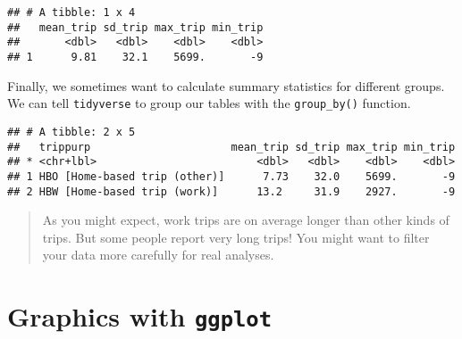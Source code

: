 \documentclass[]{book}
\newenvironment{Shaded}{\begin{snugshade}}{\end{snugshade}}
\newcommand{\DataTypeTok}[1]{\textcolor[rgb]{0.13,0.29,0.53}{#1}}
\newcommand{\KeywordTok}[1]{\textcolor[rgb]{0.13,0.29,0.53}{\textbf{#1}}}
\newcommand{\NormalTok}[1]{#1}
\newcommand{\OperatorTok}[1]{\textcolor[rgb]{0.81,0.36,0.00}{\textbf{#1}}}
\newcommand{\StringTok}[1]{\textcolor[rgb]{0.31,0.60,0.02}{#1}}
\begin{document}
\begin{verbatim}
## # A tibble: 1 x 4
##   mean_trip sd_trip max_trip min_trip
##       <dbl>   <dbl>    <dbl>    <dbl>
## 1      9.81    32.1    5699.       -9
\end{verbatim}

Finally, we sometimes want to calculate summary statistics for different groups.
We can tell \texttt{tidyverse} to group our tables with the \texttt{group\_by()} function.

\begin{Shaded}
\end{Shaded}

\begin{verbatim}
## # A tibble: 2 x 5
##   trippurp                      mean_trip sd_trip max_trip min_trip
## * <chr+lbl>                         <dbl>   <dbl>    <dbl>    <dbl>
## 1 HBO [Home-based trip (other)]      7.73    32.0    5699.       -9
## 2 HBW [Home-based trip (work)]      13.2     31.9    2927.       -9
\end{verbatim}

\begin{quote}
As you might expect, work trips are on average longer than other kinds of trips.
But some people report very long trips! You might want to filter your data more
carefully for real analyses.
\end{quote}

\hypertarget{graphics-with-ggplot}{%
\section{\texorpdfstring{Graphics with \texttt{ggplot}}{Graphics with ggplot}}\label{graphics-with-ggplot}}


\end{document}
